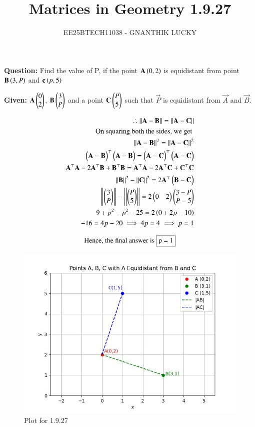 \documentclass[journal]{IEEEtran}
\title{Matrices in Geometry 1.9.27}
\author{EE25BTECH11038 - GNANTHIK LUCKY}
\begin{document}
\vspace{3cm}
\maketitle
{\let\newpage\relax\maketitle}
\textbf{Question: }
Find the value of P, if the point $\mathbf{A}\left(0,2\right)$ is equidistant from point $\mathbf{B}\left(3,P\right)$ and $\mathbf{c}\left(p,5\right)$

\textbf{Given: } 
$\mathbf{A}\begin{pmatrix}0\\2\end{pmatrix}$, $\mathbf{B}\begin{pmatrix}3\\P\end{pmatrix}$ and a point $\mathbf{C} \begin{pmatrix}P\\ 5\end{pmatrix}$ such that $\vec{P}$ is equidistant from $\vec{A}$ and $\vec{B}$. 

\begin{align}
    \therefore \left\lVert\mathbf{A}-\mathbf{B}\right\rVert=\left\lVert\mathbf{A}-\mathbf{C}\right\rVert\\
    \text{On squaring both the sides, we get }\\
    \left\lVert\mathbf{A}-\mathbf{B}\right\rVert^2=\left\lVert\mathbf{A}-\mathbf{C}\right\rVert^2\\
    \begin{pmatrix}\mathbf{A}-\mathbf{B}\end{pmatrix}^{\top}\begin{pmatrix}\mathbf{A}-\mathbf{B}\end{pmatrix}=\begin{pmatrix}\mathbf{A}-\mathbf{C}\end{pmatrix}^{\top}\begin{pmatrix}\mathbf{A}-\mathbf{C}\end{pmatrix}\\
    \mathbf{A}^{\top}\mathbf{A} - 2\mathbf{A}^{\top}\mathbf{B} + \mathbf{B}^{\top}\mathbf{B} =\mathbf{A}^{\top}\mathbf{A} - 2\mathbf{A}^{\top}\mathbf{C} + \mathbf{C}^{\top}\mathbf{C}\\
    \left\lVert\mathbf{B}\right\rVert^2 - \left\lVert\mathbf{C}\right\rVert^2=2\mathbf{A}^{\top}\begin{pmatrix}\mathbf{B}-\mathbf{C}\end{pmatrix}\\
    \left\lVert\begin{pmatrix}3\\P\end{pmatrix}\right\rVert - \left\lVert\begin{pmatrix}P\\5\end{pmatrix}\right\rVert=2\begin{pmatrix}0 & 2\end{pmatrix}\begin{pmatrix}3-P \\ P-5\end{pmatrix}\\
    9 + p^2 - p^2 -25 = 2\left(0+2p-10\right)\\
    -16=4p - 20 \implies 4p =4 \implies p=1
\end{align}


\begin{align}
 \text{Hence, the final answer is }\fbox{p = 1}   
\end{align}
\newpage
\begin{figure}[H]
    \centering
    \includegraphics[width=1\columnwidth]{Figs/1.jpg}
    \caption{Plot for 1.9.27}
    \label{fig:placeholder}
\end{figure}
\end{document}

